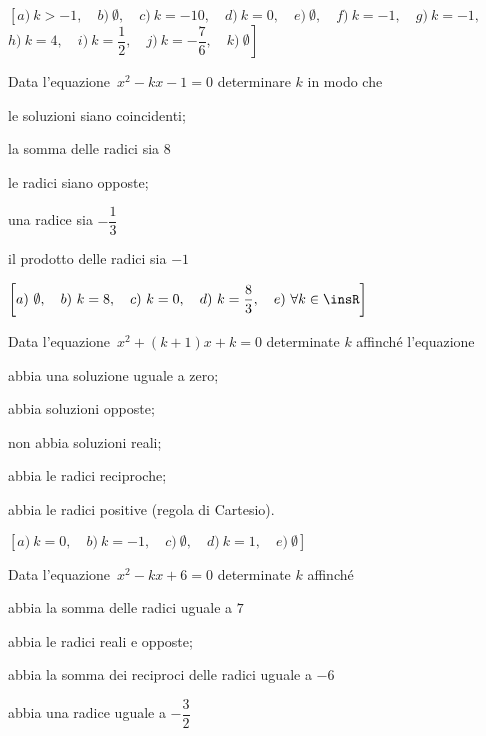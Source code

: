 \begin{flushright}
\(\left[a)~k >-1,\quad b)~\emptyset,\quad c)~k =-10,\quad 
        d)~k = 0,\quad e)~ \emptyset ,\quad f)~ k =-1 ,\quad 
        g)~ k =-1 ,\quad \right.\)
       \(\left. h)~ k = 4 ,\quad i)~ k = \dfrac{1}{2} ,\quad 
        j)~ k =-\dfrac{7}{6} ,\quad k)~\emptyset\right]\)
\end{flushright}

\begin{esercizio}[\Ast]
 \label{ese:3.98}
Data l'equazione~\(x^{2}-kx -1 = 0\) determinare \(k\) in modo che
\begin{enumeratea}
\item le soluzioni siano coincidenti;~
\item la somma delle radici sia \(8\)
\item le radici siano opposte;~
\item una radice sia \(- \dfrac{1}{3}\)
\item il prodotto delle radici sia \(-1\)
\end{enumeratea}
\end{esercizio}

\begin{flushright}
\(\left[a)~\emptyset ,\quad b)~k = 8 ,\quad c)~ k = 0,\quad 
d)~k = \dfrac{8}{3} ,\quad e)~\forall k \in \insR\right]\)
\end{flushright}

\begin{esercizio}[\Ast]
 \label{ese:3.99}
Data l'equazione~\(x^{2} + (k + 1) x + k = 0\) determinate \(k\) affinché 
l'equazione
\begin{enumeratea}
\item abbia una soluzione uguale a zero;~
\item abbia soluzioni opposte;~
\item non abbia soluzioni reali;~
\item abbia le radici reciproche;~
\item abbia le radici positive (regola di Cartesio).
\end{enumeratea}
\end{esercizio}

\begin{flushright}
\(\left[a)~ k = 0 ,\quad b)~ k =-1 ,\quad c)~ \emptyset ,\quad 
d)~ k = 1 ,\quad e)~ \emptyset \right]\)
\end{flushright}

\begin{esercizio}[\Ast]
 \label{ese:3.100}
Data l'equazione~\(x^{2}-kx + 6 = 0\) determinate \(k\) affinché
\begin{enumeratea}
\item abbia la somma delle radici uguale a \(7\)
\item abbia le radici reali e opposte;~
\item abbia la somma dei reciproci delle radici uguale a \(-6\)
\item abbia una radice uguale a \(- \dfrac{3}{2}\)
\end{enumeratea}
\end{esercizio}

